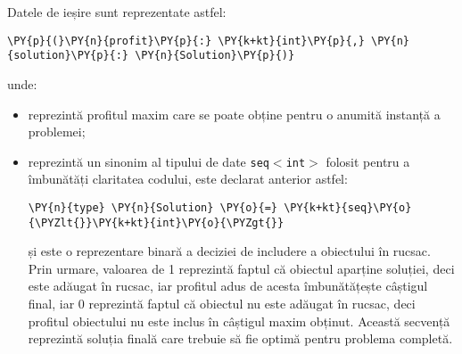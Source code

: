 \begin{sloppypar}
Datele de ieșire sunt reprezentate astfel:
\begin{Verbatim}[commandchars=\\\{\}]
                \PY{p}{(}\PY{n}{profit}\PY{p}{:} \PY{k+kt}{int}\PY{p}{,} \PY{n}{solution}\PY{p}{:} \PY{n}{Solution}\PY{p}{)}
\end{Verbatim}
unde:
\begin{itemize}
    \item {} reprezintă profitul maxim care se poate obține pentru o anumită instanță a problemei;
    \item {} reprezintă un sinonim al tipului de date \texttt{seq\(<\)int\(>\)} folosit pentru a îmbunătăți claritatea codului, este declarat anterior astfel:
\begin{Verbatim}[commandchars=\\\{\}]
                \PY{n}{type} \PY{n}{Solution} \PY{o}{=} \PY{k+kt}{seq}\PY{o}{\PYZlt{}}\PY{k+kt}{int}\PY{o}{\PYZgt{}}
\end{Verbatim}
și este o reprezentare binară a deciziei de includere a obiectului în rucsac. Prin urmare, valoarea de 1 reprezintă faptul că obiectul aparține soluției, deci este adăugat în rucsac, iar profitul adus de acesta îmbunătățește câștigul final, iar 0 reprezintă faptul că obiectul nu este adăugat în rucsac, deci profitul obiectului nu este inclus în câștigul maxim obținut. Această secvență reprezintă soluția finală care trebuie să fie optimă pentru problema completă.
\end{itemize} 

\end{sloppypar}